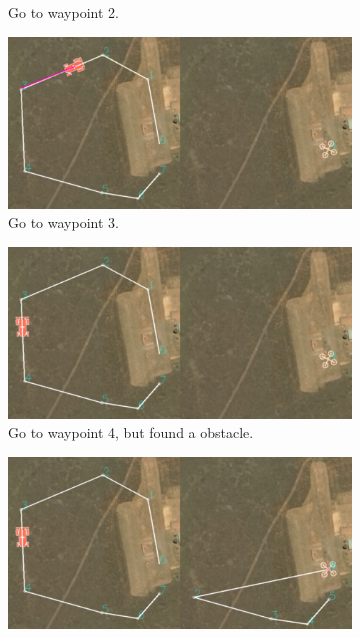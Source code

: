 \begin{figure}
\begin{subfigure}[b]{0.9\columnwidth}
    \caption{Go to waypoint 2.}
  \end{subfigure}
  \begin{subfigure}[b]{0.9\columnwidth}
    \includegraphics[width=\textwidth]{img/mission4.png}
    \caption{Go to waypoint 3.}
  \end{subfigure}
  \begin{subfigure}[b]{0.9\columnwidth}
    \includegraphics[width=\textwidth]{img/mission5.png}
    \caption{Go to waypoint 4, but found a obstacle.}
  \end{subfigure}
  \begin{subfigure}[b]{0.9\columnwidth}
    \includegraphics[width=\textwidth]{img/mission6.png}

\end{subfigure}
\end{figure}
